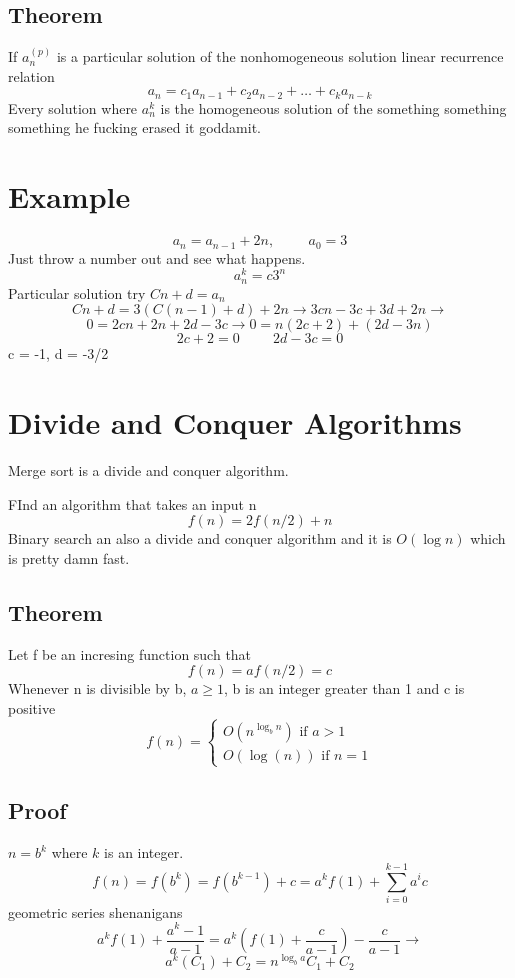 \documentclass{report}
\begin{document}
\subsection{Theorem}
If $a_n^{(p)}$ is a particular solution of the nonhomogeneous solution linear recurrence relation 
\[
a_n = c_1a_{n-1} + c_2a_{n-2} + \ldots + c_ka_{n-k}
\]
Every solution where $a_n^k$ is the homogeneous solution of the something something something he fucking erased it goddamit.

\section{Example}
\[
a_n = a_{n-1} + 2n,
\hspace{1cm}
 a_0 =3
\]
Just throw a number out and see what happens.
\[
a_n^k = c3^n
\]
Particular solution try $Cn + d = a_n$
\[
Cn+d
=
3(C(n-1)+d)+2n
\rightarrow
3cn - 3c +3d + 2n
\rightarrow
\]
\[
0
=
2cn + 2n + 2d - 3c
\longrightarrow
0 
=
n(2c+2) + (2d - 3n)
\]
\[
2c + 2 = 0
\hspace{1cm}
2d - 3c = 0
\]
c = -1, d = -3/2

\section{Divide and Conquer Algorithms}
Merge sort is a divide and conquer algorithm.

FInd an algorithm that takes an input n
\[
f(n) = 2f(n/2) + n
\]
Binary search an also a divide and conquer algorithm and it is $O(\log n)$ which is pretty damn fast.

\subsection{Theorem}
Let f be an incresing function such that 
\[
f(n) = af(n/2) = c
\]
Whenever n is divisible by b, $a \geq 1$, b is an integer greater than 1 and c is positive
\[
f(n) = 
\begin{cases}
O(n^{\log_bn}) \textrm{ if $a > 1$} \\
O(\log(n)) \textrm{ if $n = 1$}
\end{cases}
\]

\subsection{Proof}
$n = b^k$ where $k$ is an integer.
\[
f(n) = f(b^k) = f(b^{k-1}) + c
=
a^kf(1)
+
\sum^{k-1}_{i=0}a^ic
\]
geometric series shenanigans
\[
a^kf(1)
+
\frac{a^k - 1}{a-1}
=
a^k (f(1) + \frac{c}{a-1}) - \frac{c}{a-1}
\rightarrow
\]
\[
a^k(C_1) + C_2 
=
n^{\log_ba}C_1 + C_2
\]
\end{document}
